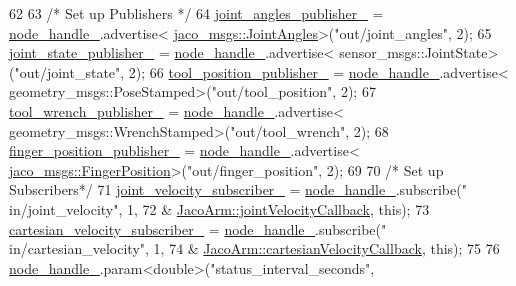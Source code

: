 \begin{DoxyCode}
62     
63     \textcolor{comment}{/* Set up Publishers */}
64     \hyperlink{classjaco_1_1JacoArm_a074f24a17f50b88921a9bc9d8e52c09b}{joint\_angles\_publisher\_} = \hyperlink{classjaco_1_1JacoArm_aa8b6a99580f2ccf8a5c509cc0f3b3c8e}{node\_handle\_}.advertise<
      \hyperlink{structjaco__msgs_1_1JointAngles__}{jaco\_msgs::JointAngles}>(\textcolor{stringliteral}{"out/joint\_angles"}, 2);
65     \hyperlink{classjaco_1_1JacoArm_a914eb71a6de747a2e63b880b2a0ac0b4}{joint\_state\_publisher\_} = \hyperlink{classjaco_1_1JacoArm_aa8b6a99580f2ccf8a5c509cc0f3b3c8e}{node\_handle\_}.advertise<
      sensor\_msgs::JointState>(\textcolor{stringliteral}{"out/joint\_state"}, 2);
66     \hyperlink{classjaco_1_1JacoArm_a9d6b0687a753f44ecdb2e93aeeddd288}{tool\_position\_publisher\_} = \hyperlink{classjaco_1_1JacoArm_aa8b6a99580f2ccf8a5c509cc0f3b3c8e}{node\_handle\_}.advertise<
      geometry\_msgs::PoseStamped>(\textcolor{stringliteral}{"out/tool\_position"}, 2);
67     \hyperlink{classjaco_1_1JacoArm_abff4dc1bbe63e0be7cd20ac7c4d37be4}{tool\_wrench\_publisher\_} = \hyperlink{classjaco_1_1JacoArm_aa8b6a99580f2ccf8a5c509cc0f3b3c8e}{node\_handle\_}.advertise<
      geometry\_msgs::WrenchStamped>(\textcolor{stringliteral}{"out/tool\_wrench"}, 2);
68     \hyperlink{classjaco_1_1JacoArm_a323990f9bd26de33240df3f107e29a49}{finger\_position\_publisher\_} = \hyperlink{classjaco_1_1JacoArm_aa8b6a99580f2ccf8a5c509cc0f3b3c8e}{node\_handle\_}.advertise<
      \hyperlink{structjaco__msgs_1_1FingerPosition__}{jaco\_msgs::FingerPosition}>(\textcolor{stringliteral}{"out/finger\_position"}, 2);
69 
70     \textcolor{comment}{/* Set up Subscribers*/}
71     \hyperlink{classjaco_1_1JacoArm_a531289127704e9ffb5055cc58d3f90f8}{joint\_velocity\_subscriber\_} = \hyperlink{classjaco_1_1JacoArm_aa8b6a99580f2ccf8a5c509cc0f3b3c8e}{node\_handle\_}.subscribe(\textcolor{stringliteral}{"
      in/joint\_velocity"}, 1,
72                                                       &
      \hyperlink{classjaco_1_1JacoArm_a2c2cfc44e480845bbf7e78c6bfe454b6}{JacoArm::jointVelocityCallback}, \textcolor{keyword}{this});
73     \hyperlink{classjaco_1_1JacoArm_a7598c2dfaa6677241e490eb42f175a3b}{cartesian\_velocity\_subscriber\_} = \hyperlink{classjaco_1_1JacoArm_aa8b6a99580f2ccf8a5c509cc0f3b3c8e}{node\_handle\_}.subscribe(\textcolor{stringliteral}{"
      in/cartesian\_velocity"}, 1,
74                                                           &
      \hyperlink{classjaco_1_1JacoArm_a091f2eaffef84362f69e3b49482982db}{JacoArm::cartesianVelocityCallback}, \textcolor{keyword}{this});
75 
76     \hyperlink{classjaco_1_1JacoArm_aa8b6a99580f2ccf8a5c509cc0f3b3c8e}{node\_handle\_}.param<\textcolor{keywordtype}{double}>(\textcolor{stringliteral}{"status\_interval\_seconds"}, 

\end{DoxyCode}
